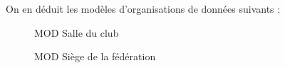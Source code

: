 \newpage
On en déduit les modèles d'organisations de données suivants : \\

\begin{figure}[!htb]
    \begin{center}
    \caption{\label{cc1_mod1} MOD Salle du club}
    \end{center}
\end{figure}

\begin{figure}[!htb]
    \begin{center}
    \caption{\label{cc1_mod2} MOD Siège de la fédération}
    \end{center}
\end{figure}

